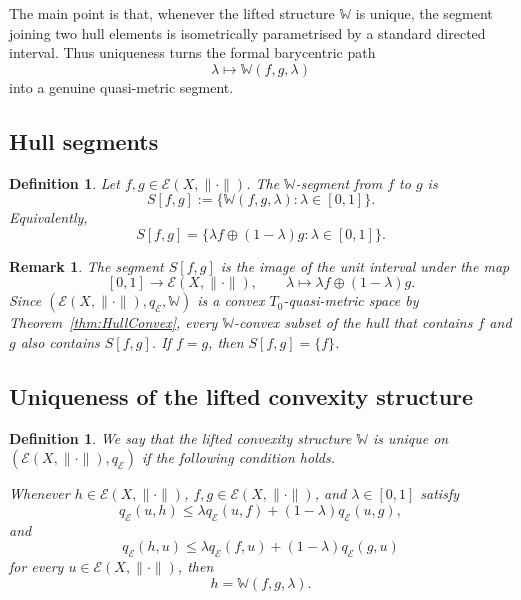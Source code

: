 \documentclass[preprint,12pt]{elsarticle}
\numberwithin{equation}{section}
\newtheorem{definition}[theorem]{Definition}
\newtheorem{remark}[theorem]{Remark}
\newcommand{\E}{\mathcal{E}}
\begin{document}
The main point is that, whenever the lifted structure \(\mathbb W\) is unique,
the segment joining two hull elements is isometrically parametrised by a
standard directed interval.  Thus uniqueness turns the formal barycentric path
\[
\lambda\longmapsto \mathbb W(f,g,\lambda)
\]
into a genuine quasi-metric segment.

\subsection{Hull segments}

\begin{definition}\label{def:hullsegments}
Let \(f,g\in\E(X,\|\cdot\|)\).  The \emph{\(\mathbb W\)-segment} from \(f\)
to \(g\) is
\[
S[f,g]
:=
\{\mathbb W(f,g,\lambda):\lambda\in[0,1]\}.
\]
Equivalently,
\[
S[f,g]
=
\{\lambda f\oplus(1-\lambda)g:\lambda\in[0,1]\}.
\]
\end{definition}

\begin{remark}\label{rem:hullsegments-basic}
The segment \(S[f,g]\) is the image of the unit interval under the map
\[
[0,1]\longrightarrow \E(X,\|\cdot\|),
\qquad
\lambda\longmapsto \lambda f\oplus(1-\lambda)g.
\]
Since \((\E(X,\|\cdot\|),q_{\E},\mathbb W)\) is a convex
\(T_0\)-quasi-metric space by Theorem~\ref{thm:HullConvex}, every
\(\mathbb W\)-convex subset of the hull that contains \(f\) and \(g\) also
contains \(S[f,g]\).  If \(f=g\), then \(S[f,g]=\{f\}\).
\end{remark}

\subsection{Uniqueness of the lifted convexity structure}

\begin{definition}\label{def:uniqW}
We say that the lifted convexity structure \(\mathbb W\) is \emph{unique} on
\((\E(X,\|\cdot\|),q_{\E})\) if the following condition holds.

Whenever \(h\in\E(X,\|\cdot\|)\), \(f,g\in\E(X,\|\cdot\|)\), and
\(\lambda\in[0,1]\) satisfy
\[
q_{\E}(u,h)
\le
\lambda q_{\E}(u,f)+(1-\lambda)q_{\E}(u,g),
\]
and
\[
q_{\E}(h,u)
\le
\lambda q_{\E}(f,u)+(1-\lambda)q_{\E}(g,u)
\]
for every \(u\in\E(X,\|\cdot\|)\), then
\[
h=\mathbb W(f,g,\lambda).
\]
\end{definition}
\end{document}
